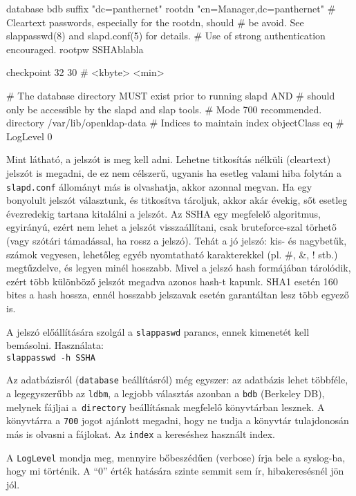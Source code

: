 \begin{VerbExample}
database        bdb
suffix          "dc=panthernet"
rootdn          "cn=Manager,dc=panthernet"
# Cleartext passwords, especially for the rootdn, should
# be avoid.  See slappasswd(8) and slapd.conf(5) for details.
# Use of strong authentication encouraged.
rootpw          {SSHA}blabla

checkpoint      32      30 # <kbyte> <min>


# The database directory MUST exist prior to running slapd AND
# should only be accessible by the slapd and slap tools.
# Mode 700 recommended.
directory       /var/lib/openldap-data
# Indices to maintain
index   objectClass     eq
#
LogLevel 0
\end{VerbExample}

Mint látható, a jelszót is meg kell adni. Lehetne titkosítás nélküli (cleartext) jelszót is megadni, de ez nem
célszerű, ugyanis ha esetleg valami hiba folytán a \texttt{slapd.conf} állományt más is olvashatja, akkor azonnal
megvan. Ha egy bonyolult jelszót választunk, és titkosítva tároljuk, akkor akár évekig, sőt esetleg évezredekig
tartana kitalálni a jelszót. Az \textsc{SSHA} egy megfelelő algoritmus, egyirányú, ezért
nem lehet a jelszót visszaállítani, csak bruteforce-szal törhető (vagy szótári támadással, ha rossz a jelszó). Tehát a
jó jelszó: kis-  és nagybetűk, számok vegyesen, lehetőleg egyéb nyomtatható karakterekkel (pl. \#, \&, ! stb.)
megtűzdelve, és legyen minél hosszabb. Mivel a jelszó hash formájában tárolódik, ezért több különböző jelszót megadva
azonos hash-t kapunk. \textsc{SHA1} esetén 160 bites a hash hossza, ennél hosszabb jelszavak esetén garantáltan lesz több
egyező is.


A jelszó előállítására szolgál a \texttt{slappaswd} parancs, ennek kimenetét kell bemásolni. Használata:\\
\texttt{slappasswd -h {SSHA}}


Az adatbázisról (\texttt{database} beállításról) még egyszer: az adatbázis lehet többféle, a legegyszerűbb az
\texttt{ldbm}, a legjobb választás azonban a  \texttt{bdb} (Berkeley DB), melynek fájljai a~\texttt{directory}
beállításnak megfelelő könyvtárban lesznek. A könyvtárra a \texttt{700} jogot ajánlott megadni, hogy ne tudja a
könyvtár tulajdonosán más is olvasni a fájlokat. Az  \texttt{index} a  kereséshez használt index.

A \texttt{LogLevel} mondja meg, mennyire bőbeszédűen (verbose) írja bele a syslog-ba, hogy mi történik. A ``0'' érték
hatására szinte semmit sem ír, hibakeresésnél jön jól.

